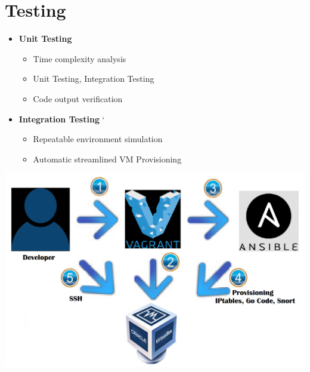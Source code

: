 \section*{\color{NavyBlue}Testing}

\begin{itemize}
\item\Large{\color{Blue}\textbf{Unit Testing}}
    \begin{itemize} %
        \item Time complexity analysis
        \item Unit Testing, Integration Testing
        \item Code output verification
    \end{itemize}
\end{itemize}

\begin{itemize}
\item\Large{\color{Blue}\textbf{Integration Testing}}
`   \begin{itemize}
        \item Repeatable environment simulation
        \item Automatic streamlined VM Provisioning
    \end{itemize}
\end{itemize}

\begin{center}
\includegraphics[width=0.8\linewidth]{figures/Vagrant.png}
\end{center}
